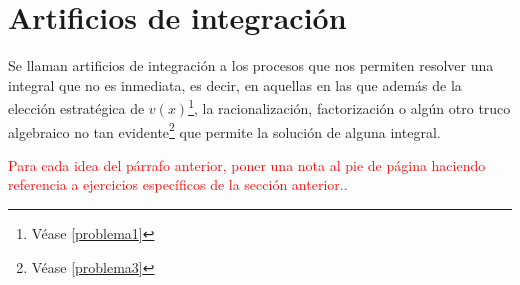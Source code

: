 \section{Artificios de integración}\label{sec4}
Se llaman artificios de integración a los procesos que nos permiten resolver una integral que no es inmediata, es decir, en aquellas en las que además de la elección estratégica de $v(x)$\footnote{Véase \cref{problema1}}, la racionalización, factorización o algún otro truco algebraico no tan evidente\footnote{Véase \cref{problema3}} que permite la solución de alguna integral.

\textcolor{red}{Para cada idea del párrafo anterior, poner una nota al pie de página haciendo referencia a ejercicios específicos de la sección anterior..}











